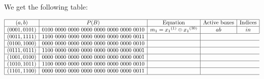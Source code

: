 \documentclass[a4paper]{article}
\begin{document}
We get the following table:

\begin{equation*}
  \begin{array}{|c|c|c|c|c|}
    \hline
    (a,b) & P(B) & \text{Equation} & \text{Active boxes} & \text{Indices} \\
    \hline
    (0001,0101) & 0100\ 0000\ 0000\ 0000\ 0000\ 0000\ 0000\ 0010 & m_1 = {x_1}^{(1)} \oplus {x_1}^{(30)} & ab & in  \\
    \hline
    (0011,1111) & 1100\ 0000\ 0000\ 0000\ 0000\ 0000\ 0000\ 0011 &    \\
    \hline
    (0100,1000) & 0000\ 0000\ 0000\ 0000\ 0000\ 0000\ 0000\ 0010 &   \\
    \hline
    (0111,0111) & 1100\ 0000\ 0000\ 0000\ 0000\ 0000\ 0000\ 0001 &  \\
    \hline
    (1001,0100) & 0000\ 0000\ 0000\ 0000\ 0000\ 0000\ 0000\ 0001 &  \\
    \hline
    (1010,1011) & 1100\ 0000\ 0000\ 0000\ 0000\ 0000\ 0000\ 0010 &  \\
    \hline
    (1101,1100) & 0000\ 0000\ 0000\ 0000\ 0000\ 0000\ 0000\ 0011 &  \\
    \hline
  \end{array}
\end{equation*}

 
\end{document}
